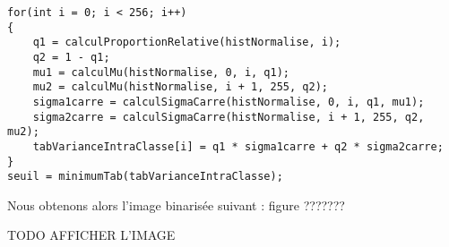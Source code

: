 \documentclass{article}
\begin{document}
 \begin{lstlisting}
for(int i = 0; i < 256; i++)
{
    q1 = calculProportionRelative(histNormalise, i);
    q2 = 1 - q1;
    mu1 = calculMu(histNormalise, 0, i, q1);
    mu2 = calculMu(histNormalise, i + 1, 255, q2);
    sigma1carre = calculSigmaCarre(histNormalise, 0, i, q1, mu1);
    sigma2carre = calculSigmaCarre(histNormalise, i + 1, 255, q2, mu2);
    tabVarianceIntraClasse[i] = q1 * sigma1carre + q2 * sigma2carre;
}
seuil = minimumTab(tabVarianceIntraClasse);
 \end{lstlisting}

 Nous obtenons alors l'image binarisée suivant : figure ???????

 TODO AFFICHER L'IMAGE

 
\end{document}
